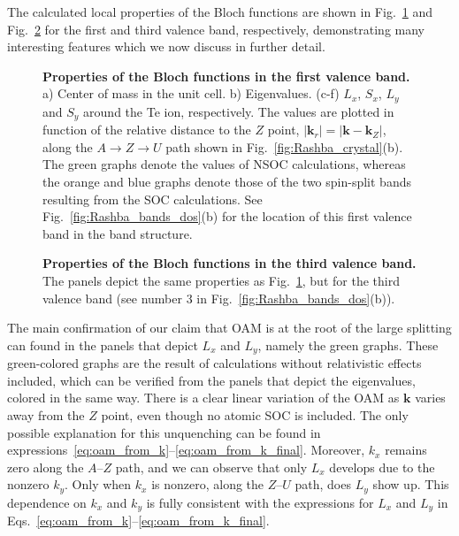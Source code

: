 The calculated local properties of the Bloch functions are shown in Fig.~\ref{fig:Rashba_oamvseigvalv1} and Fig.~\ref{fig:Rashba_oamvseigvalv2} for the first and third valence band, respectively, demonstrating many interesting features which we now discuss in further detail.
\begin{figure}
	\centering
{}
\caption{\label{fig:Rashba_oamvseigvalv1}{\bf Properties of the Bloch functions in the first valence band.} a) Center of mass in the unit cell. b) Eigenvalues. (c-f) $L_x$, $S_x$, $L_y$ and $S_y$ around the Te ion, respectively. The values are plotted in function of the relative distance to the $Z$ point, $|\bm{k}_r| = |\bm{k} - \bm{k}_Z|$, along the $A \rightarrow Z \rightarrow U$ path shown in Fig.~\ref{fig:Rashba_crystal}(b). The green graphs denote the values of NSOC calculations, whereas the orange and blue graphs denote those of the two spin-split bands resulting from the SOC calculations. See Fig.~\ref{fig:Rashba_bands_dos}(b) for the location of this first valence band in the band structure.}
\end{figure}
\begin{figure}[h!]
	\centering
{}
\caption{\label{fig:Rashba_oamvseigvalv2}{\bf Properties of the Bloch functions in the third valence band.} The panels depict the same properties as Fig.~\ref{fig:Rashba_oamvseigvalv1}, but for the third valence band (see number 3 in Fig.~\ref{fig:Rashba_bands_dos}(b)).}
\end{figure}
    
The main confirmation of our claim that OAM is at the root of the large splitting can found in the panels that depict $L_x$ and $L_y$, namely the green graphs. These green-colored graphs are the result of calculations without relativistic effects included, which can be verified from the panels that depict the eigenvalues, colored in the same way.
There is a clear linear variation of the OAM as $\bm k$ varies away from the $Z$ point, even though no atomic SOC is included.
The only possible explanation for this unquenching can be found in expressions~\eqref{eq:oam_from_k}--\eqref{eq:oam_from_k_final}.
Moreover, $k_x$ remains zero along the $A$--$Z$ path, and we can observe that only $L_x$ develops due to the nonzero $k_y$. Only when $k_x$ is nonzero, along the $Z$--$U$ path, does $L_y$ show up. This dependence on $k_x$ and $k_y$ is fully consistent with the expressions for $L_x$ and $L_y$ in Eqs.~\eqref{eq:oam_from_k}--\eqref{eq:oam_from_k_final}.
    
